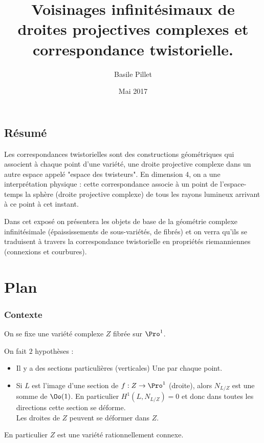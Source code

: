 \documentclass[a4paper]{amsart}
\author{Basile Pillet}
\date{Mai 2017}
\title{Voisinages infinitésimaux de droites projectives complexes et correspondance twistorielle.}
\begin{document}
\maketitle
\tableofcontents


\subsection{Résumé}
\label{sec:org2cb3553}

Les correspondances twistorielles sont des constructions géométriques qui associent à chaque point d'une variété, une droite projective complexe dans un autre espace appelé "espace des twisteurs". En dimension 4, on a une interprétation physique : cette correspondance associe à un point de l’espace-temps la sphère (droite projective complexe) de tous les rayons lumineux arrivant à ce point à cet instant.

Dans cet exposé on présentera les objets de base de la géométrie complexe infinitésimale (épaississements de sous-variétés, de fibrés) et on verra qu'ils se traduisent à travers la correspondance twistorielle en propriétés riemanniennes (connexions et courbures).

\section{Plan}
\label{sec:org28f316f}

\subsubsection{Contexte}
\label{sec:org7b07137}
On se fixe une variété complexe \(Z\) fibrée sur \(\Pro^1\).

On fait \(2\) hypothèses :
\begin{itemize}
\item Il y a des sections particulières (verticales)
Une par chaque point.
\item Si \(L\) est l'image d'une section de \(f : Z \to \Pro^1\) (droite), alors 
\(N_{L/Z}\) est une somme de \(\Oo(1)\).
En particulier \(H^1(L,N_{L/Z}) = 0\) et donc dans toutes les directions cette section se déforme.\\
Les droites de \(Z\) peuvent se déformer dans \(Z\).
\end{itemize}

En particulier \(Z\) est une variété rationnellement connexe.
\end{document}
